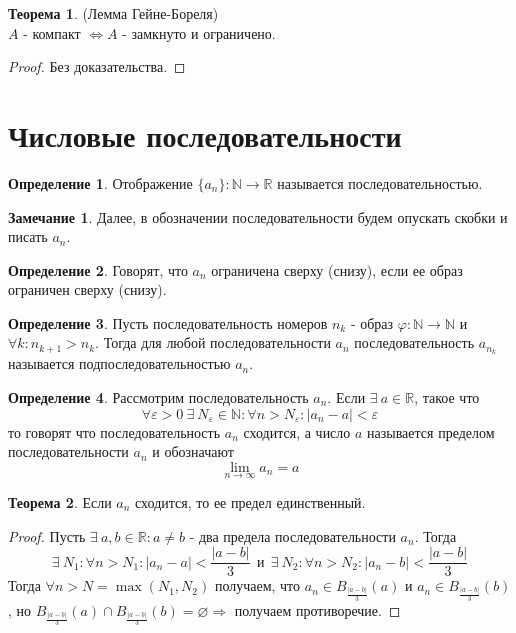 \documentclass[a4paper, 12pt]{article}
\newcommand{\N}{\mathbb{N}}
\newcommand{\R}{\mathbb{R}}
\renewcommand{\phi}{\varphi}
\renewcommand{\epsilon}{\varepsilon}
\newcommand{\lra}{\Leftrightarrow}
\renewcommand{\emptyset}{\varnothing}
\theoremstyle{definition}
\newtheorem*{definition}{Определение}
\newtheorem*{theorem}{Теорема}
\newtheorem*{comm}{Замечание}
\begin{document}
        \begin{theorem} (Лемма Гейне-Бореля)\\
            $A$ - компакт $\lra A$ - замкнуто и ограничено.
        \end{theorem} 
        \begin{proof}
            Без доказательства.
        \end{proof}
    \section{Числовые последовательности}
        \begin{definition}
            Отображение $\{a_n\}: \N\to \R$ называется последовательностью.
        \end{definition} 
        \begin{comm}
            Далее, в обозначении последовательности будем опускать скобки и писать $a_n$.
        \end{comm} 
        \begin{definition}
            Говорят, что $a_n$ ограничена сверху (снизу), если ее образ ограничен сверху (снизу).
        \end{definition} 
        \begin{definition}
            Пусть последовательность номеров $n_k$ - образ $\phi: \N\to \N$ и $\forall k: n_{k+1}>n_k$. Тогда для любой последовательности $a_n$ последовательность $a_{n_k}$ называется подпоследовательностью $a_n$.
        \end{definition} 
        \begin{definition}
            Рассмотрим последовательность $a_n$. Если $\exists \ a\in \R$, такое что 
            \[\forall \epsilon>0\ \exists\ N_{\epsilon}\in \N: \forall n>N_{\epsilon}: |a_n-a|<\epsilon\] то говорят что последовательность $a_n$ сходится, а число $a$ называется пределом последовательности $a_n$ и обозначают
            \[\lim\limits_{n\to \infty} a_n=a\]
        \end{definition}
        \begin{theorem}
            Если $a_n$ сходится, то ее предел единственный.
        \end{theorem} 
        \begin{proof}
            Пусть $\exists\ a,b\in \R: a\ne b$ - два предела последовательности $a_n$. Тогда
            \[\exists\ N_1: \forall n>N_1: |a_n-a|<\frac{|a-b|}{3}\  \ \text{и}\ \ \exists\ N_2: \forall n>N_2: |a_n-b|<\frac{|a-b|}{3}\]
            Тогда $\forall n>N = \max{(N_1, N_2)}$ получаем, что $a_n\in B_{\frac{|a-b|}{3}}(a)$ и $a_n\in B_{\frac{|a-b|}{3}}(b)$, но $B_{\frac{|a-b|}{3}}(a)\cap B_{\frac{|a-b|}{3}}(b)= \emptyset \Rightarrow$ получаем противоречие.
        \end{proof} 
\end{document}
